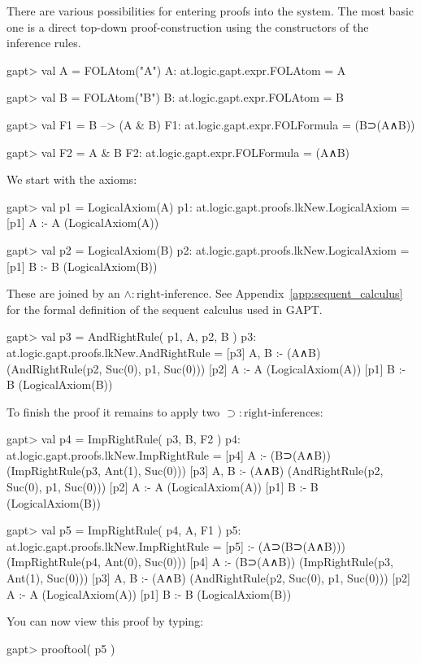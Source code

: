 \documentclass[a4paper,11pt]{article}
\newcommand{\impl}{\supset} %
\renewcommand{\land}{\wedge}
\begin{document}
There are various possibilities for entering proofs into the system. The most
basic one is a direct top-down proof-construction using the constructors
of the inference rules.
\begin{clilisting}
gapt> val A = FOLAtom("A")
A: at.logic.gapt.expr.FOLAtom = A

gapt> val B = FOLAtom("B")
B: at.logic.gapt.expr.FOLAtom = B

gapt> val F1 = B --> (A & B)
F1: at.logic.gapt.expr.FOLFormula = (B⊃(A∧B))

gapt> val F2 = A & B
F2: at.logic.gapt.expr.FOLFormula = (A∧B)

\end{clilisting}
%
We start with the axioms:
%
\begin{clilisting}
gapt> val p1 = LogicalAxiom(A)
p1: at.logic.gapt.proofs.lkNew.LogicalAxiom =
[p1] A :- A    (LogicalAxiom(A))

gapt> val p2 = LogicalAxiom(B)
p2: at.logic.gapt.proofs.lkNew.LogicalAxiom =
[p1] B :- B    (LogicalAxiom(B))

\end{clilisting}
%
These are joined by an $\land:\mathrm{right}$-inference. See Appendix~\ref{app:sequent_calculus}
for the formal definition of the sequent calculus used in GAPT.
\begin{clilisting}
gapt> val p3 = AndRightRule( p1, A, p2, B )
p3: at.logic.gapt.proofs.lkNew.AndRightRule =
[p3] A, B :- (A∧B)    (AndRightRule(p2, Suc(0), p1, Suc(0)))
[p2] A :- A    (LogicalAxiom(A))
[p1] B :- B    (LogicalAxiom(B))

\end{clilisting}
%
To finish the proof it remains to apply two $\impl:\mathrm{right}$-inferences:
%
\begin{clilisting}
gapt> val p4 = ImpRightRule( p3, B, F2 )
p4: at.logic.gapt.proofs.lkNew.ImpRightRule =
[p4] A :- (B⊃(A∧B))    (ImpRightRule(p3, Ant(1), Suc(0)))
[p3] A, B :- (A∧B)    (AndRightRule(p2, Suc(0), p1, Suc(0)))
[p2] A :- A    (LogicalAxiom(A))
[p1] B :- B    (LogicalAxiom(B))

gapt> val p5 = ImpRightRule( p4, A, F1 )
p5: at.logic.gapt.proofs.lkNew.ImpRightRule =
[p5]  :- (A⊃(B⊃(A∧B)))    (ImpRightRule(p4, Ant(0), Suc(0)))
[p4] A :- (B⊃(A∧B))    (ImpRightRule(p3, Ant(1), Suc(0)))
[p3] A, B :- (A∧B)    (AndRightRule(p2, Suc(0), p1, Suc(0)))
[p2] A :- A    (LogicalAxiom(A))
[p1] B :- B    (LogicalAxiom(B))

\end{clilisting}
%
You can now view this proof by typing:
\begin{clilisting}
gapt> prooftool( p5 )

\end{clilisting}
\end{document}
